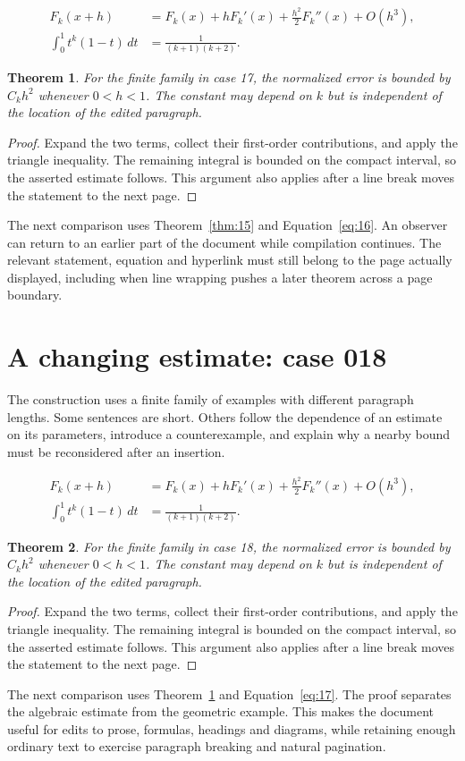 \documentclass[a4paper,10pt]{article}
\newtheorem{theorem}{Theorem}[section]
\begin{document}
\lipsum[19-20]
\begin{align}\label{eq:16}
 F_k(x+h)&=F_k(x)+hF_k'(x)+\frac{h^2}{2}F_k''(x)+O(h^3),\\
 \int_0^1 t^k(1-t)\,dt&=\frac{1}{(k+1)(k+2)}.
\end{align}
\begin{theorem}\label{thm:16}
For the finite family in case 17, the normalized error is bounded by $C_k h^2$ whenever $0<h<1$. The constant may depend on $k$ but is independent of the location of the edited paragraph.
\end{theorem}
\begin{proof}
Expand the two terms, collect their first-order contributions, and apply the
triangle inequality. The remaining integral is bounded on the compact interval,
so the asserted estimate follows. This argument also applies after a line break
moves the statement to the next page.
\end{proof}
The next comparison uses Theorem~\ref{thm:15} and Equation~\ref{eq:16}. An observer can return to an earlier part of the document while compilation continues. The relevant statement, equation and hyperlink must still belong to the page actually displayed, including when line wrapping pushes a later theorem across a page boundary.

\lipsum[8]

\section{A changing estimate: case 018}\label{unit:17}
The construction uses a finite family of examples with different paragraph lengths. Some sentences are short. Others follow the dependence of an estimate on its parameters, introduce a counterexample, and explain why a nearby bound must be reconsidered after an insertion.

\lipsum[22-23]
\begin{align}\label{eq:17}
 F_k(x+h)&=F_k(x)+hF_k'(x)+\frac{h^2}{2}F_k''(x)+O(h^3),\\
 \int_0^1 t^k(1-t)\,dt&=\frac{1}{(k+1)(k+2)}.
\end{align}
\begin{theorem}\label{thm:17}
For the finite family in case 18, the normalized error is bounded by $C_k h^2$ whenever $0<h<1$. The constant may depend on $k$ but is independent of the location of the edited paragraph.
\end{theorem}
\begin{proof}
Expand the two terms, collect their first-order contributions, and apply the
triangle inequality. The remaining integral is bounded on the compact interval,
so the asserted estimate follows. This argument also applies after a line break
moves the statement to the next page.
\end{proof}
The next comparison uses Theorem~\ref{thm:16} and Equation~\ref{eq:17}. The proof separates the algebraic estimate from the geometric example. This makes the document useful for edits to prose, formulas, headings and diagrams, while retaining enough ordinary text to exercise paragraph breaking and natural pagination.
\end{document}
